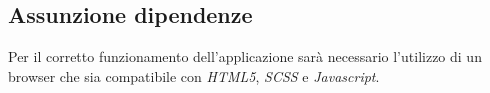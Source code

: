 	
	\subsection{Assunzione dipendenze}
	Per il corretto funzionamento dell’applicazione sarà necessario l’utilizzo di un browser che sia compatibile con \emph{HTML5}, \emph{SCSS} e \emph{Javascript}.
